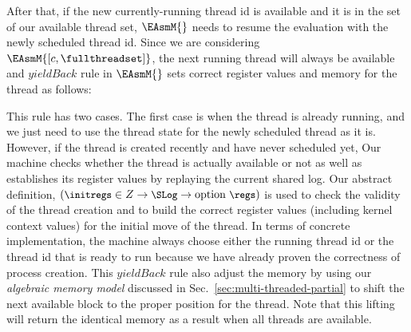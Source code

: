 After that, if the new currently-running thread id is available and it is in the set of our available thread set,
$\EAsmM{}$ needs to resume the evaluation with the newly scheduled thread id. 
Since we are considering $\EAsmM{[c, \fullthreadset]}$, the next running thread will always be 
available and $yieldBack$ rule in $\EAsmM{}$ sets correct register values and memory for the thread as follows:
\begin{small}
\begin{mathpar}
\end{mathpar}
\end{small}
This rule has two cases. 
The first case is when the thread is already running, and we just need to use the thread state for the newly scheduled thread as it is.
However, if the thread is created recently and have never scheduled yet, 
Our machine checks whether the thread is actually available or not as well as establishes its register values by replaying the current shared log. 
Our abstract definition, 
$\begin{small}(\initregs \in Z \rightarrow \SLog \rightarrow \mathrm{option}\ \regs) \end{small}$ 
is used to check the validity of the thread creation and to build the 
correct register values (including kernel context values) for the initial move of the thread. 
In terms of concrete implementation, the machine always choose either the running thread id or the thread id that is ready to run
because we have already proven the correctness of process creation.
This $yieldBack$ rule also 
adjust the memory by using our \textit{algebraic memory model} discussed in Sec.~\ref{sec:multi-threaded-partial}
to shift the next 
available block to the proper position for the thread. 
Note that this lifting will return the identical memory as a result when all threads are available.


